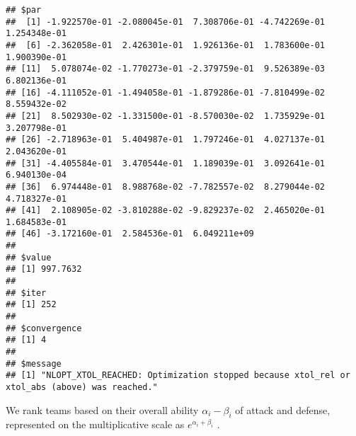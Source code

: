 \documentclass[
]{article}
\newenvironment{Shaded}{\begin{snugshade}}{\end{snugshade}}
\newcommand{\AttributeTok}[1]{\textcolor[rgb]{0.77,0.63,0.00}{#1}}
\newcommand{\CommentTok}[1]{\textcolor[rgb]{0.56,0.35,0.01}{\textit{#1}}}
\newcommand{\DecValTok}[1]{\textcolor[rgb]{0.00,0.00,0.81}{#1}}
\newcommand{\FunctionTok}[1]{\textcolor[rgb]{0.00,0.00,0.00}{#1}}
\newcommand{\NormalTok}[1]{#1}
\newcommand{\OtherTok}[1]{\textcolor[rgb]{0.56,0.35,0.01}{#1}}
\newcommand{\SpecialCharTok}[1]{\textcolor[rgb]{0.00,0.00,0.00}{#1}}
\newcommand{\StringTok}[1]{\textcolor[rgb]{0.31,0.60,0.02}{#1}}
\begin{document}
\begin{verbatim}
## $par
##  [1] -1.922570e-01 -2.080045e-01  7.308706e-01 -4.742269e-01  1.254348e-01
##  [6] -2.362058e-01  2.426301e-01  1.926136e-01  1.783600e-01  1.900390e-01
## [11]  5.078074e-02 -1.770273e-01 -2.379759e-01  9.526389e-03  6.802136e-01
## [16] -4.111052e-01 -1.494058e-01 -1.879286e-01 -7.810499e-02  8.559432e-02
## [21]  8.502930e-02 -1.331500e-01 -8.570030e-02  1.735929e-01  3.207798e-01
## [26] -2.718963e-01  5.404987e-01  1.797246e-01  4.027137e-01  2.043620e-01
## [31] -4.405584e-01  3.470544e-01  1.189039e-01  3.092641e-01  6.940130e-04
## [36]  6.974448e-01  8.988768e-02 -7.782557e-02  8.279044e-02  4.718327e-01
## [41]  2.108905e-02 -3.810288e-02 -9.829237e-02  2.465020e-01  1.684583e-01
## [46] -3.172160e-01  2.584536e-01  6.049211e+09
## 
## $value
## [1] 997.7632
## 
## $iter
## [1] 252
## 
## $convergence
## [1] 4
## 
## $message
## [1] "NLOPT_XTOL_REACHED: Optimization stopped because xtol_rel or xtol_abs (above) was reached."
\end{verbatim}

We rank teams based on their overall ability \(\alpha_i - \beta_i\) of
attack and defense, represented on the multiplicative scale as
\(e^{\alpha_i + \beta_i}\) .

\begin{Shaded}
\end{Shaded}
\end{document}
